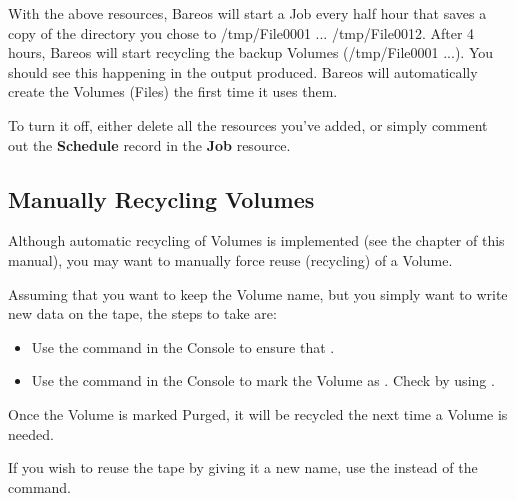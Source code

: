 With the above resources, Bareos will start a Job every half hour that saves a
copy of the directory you chose to /tmp/File0001 ... /tmp/File0012. After 4
hours, Bareos will start recycling the backup Volumes (/tmp/File0001 ...). You
should see this happening in the output produced. Bareos will automatically
create the Volumes (Files) the first time it uses them.

To turn it off, either delete all the resources you've added, or simply
comment out the {\bf Schedule} record in the {\bf Job} resource.

\subsection{Manually Recycling Volumes}
\label{manualrecycling}

Although automatic recycling of Volumes is implemented (see the
 chapter of
this manual), you may want to manually force reuse (recycling) of a Volume.

Assuming that you want to keep the Volume name, but you simply want to write
new data on the tape, the steps to take are:

\begin{itemize}
\item Use the  command in the Console to  ensure that
   .
\item Use the  command in the Console  to mark the
   Volume as . Check by using  .
\end{itemize}

Once the Volume is marked Purged, it will be recycled the next time a Volume
is needed.

If you wish to reuse the tape by giving it a new name, use the  instead of the  command.

